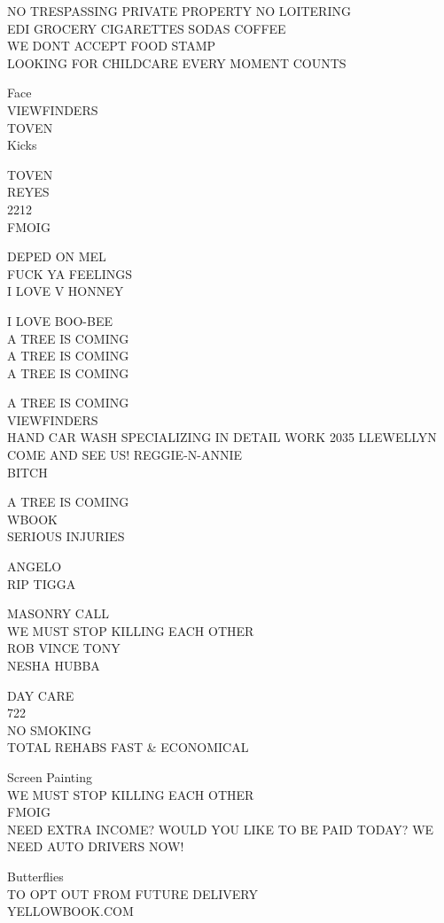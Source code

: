 \documentclass[10pt,letterpaper]{article}
\begin{document}
NO TRESPASSING PRIVATE PROPERTY NO LOITERING\\
EDI GROCERY CIGARETTES SODAS COFFEE\\
WE DONT ACCEPT FOOD STAMP\\
LOOKING FOR CHILDCARE EVERY MOMENT COUNTS

Face\\
VIEWFINDERS\\
TOVEN\\
Kicks

TOVEN\\
REYES\\
2212\\
FMOIG

DEPED ON MEL\\
FUCK YA FEELINGS\\
I LOVE V HONNEY

I LOVE BOO{-}BEE\\
A TREE IS COMING\\
A TREE IS COMING\\
A TREE IS COMING

A TREE IS COMING\\
VIEWFINDERS\\
HAND CAR WASH SPECIALIZING IN DETAIL WORK 2035 LLEWELLYN COME AND SEE US!  REGGIE{-}N{-}ANNIE\\
BITCH

A TREE IS COMING\\
WBOOK\\
SERIOUS INJURIES

ANGELO\\
RIP TIGGA

MASONRY CALL\\
WE MUST STOP KILLING EACH OTHER\\
ROB VINCE TONY\\
NESHA HUBBA

DAY CARE\\
722\\
NO SMOKING\\
TOTAL REHABS FAST \& ECONOMICAL

Screen Painting\\
WE MUST STOP KILLING EACH OTHER\\
FMOIG\\
NEED EXTRA INCOME?  WOULD YOU LIKE TO BE PAID TODAY?  WE NEED AUTO DRIVERS NOW!

Butterflies\\
TO OPT OUT FROM FUTURE DELIVERY\\
YELLOWBOOK.COM
\end{document}
